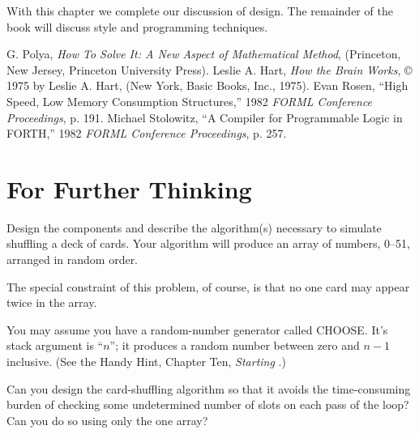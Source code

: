With this chapter we complete our discussion of design. The remainder
of the book will discuss style and programming techniques.
%

\begin{references}{9}
 G. Polya, \emph{How To Solve It: A New Aspect of
   Mathematical Method}, (Princeton, New Jersey, Princeton University
   Press).
 Leslie A. Hart, \emph{How the Brain Works},
   \copyright{} 1975 by Leslie A. Hart, (New York, Basic Books, Inc.,
   1975).
 Evan Rosen, ``High Speed, Low Memory Consumption
   Structures,'' 1982 \emph{FORML Conference Proceedings}, p. 191.
 Michael Stolowitz, ``A Compiler for Programmable
   Logic in FORTH,'' 1982 \emph{FORML Conference Proceedings}, p. 257.
\end{references}

\section{For Further Thinking}

Design the components and describe the algorithm(s) necessary to simulate
shuffling a deck of cards. Your algorithm will produce an array of
numbers, 0--51, arranged in random order.

The special constraint of this problem, of course, is that no one card
may appear twice in the array.

You may assume you have a random-number generator called
CHOOSE. It's stack argument is ``$n$''; it produces a random number
between zero and $n-1$ inclusive. (See the Handy Hint, Chapter Ten,
\emph{Starting \Forth{}}.)

Can you design the card-shuffling algorithm so that it avoids the
time-consuming burden of checking some undetermined number of slots
on each pass of the loop? Can you do so using only the one array?
